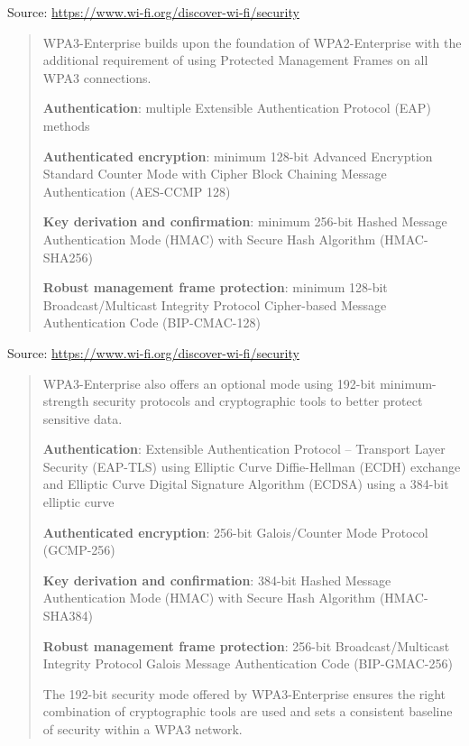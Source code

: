 \documentclass[Screen16to9,17pt]{foils}
\begin{document}
Source: \url{https://www.wi-fi.org/discover-wi-fi/security}




\begin{quote}
WPA3-Enterprise builds upon the foundation of WPA2-Enterprise with the additional requirement of using Protected Management Frames on all WPA3 connections.

\begin{list2}
\item {\bf Authentication}: multiple Extensible Authentication Protocol (EAP) methods
\item {\bf Authenticated encryption}: minimum 128-bit Advanced Encryption Standard Counter Mode with Cipher Block Chaining Message Authentication (AES-CCMP 128)
\item {\bf Key derivation and confirmation}: minimum 256-bit Hashed Message Authentication Mode (HMAC) with Secure Hash Algorithm (HMAC-SHA256)
\item {\bf Robust management frame protection}: minimum 128-bit Broadcast/Multicast Integrity Protocol Cipher-based Message Authentication Code (BIP-CMAC-128)
\end{list2}
\end{quote}

Source: \url{https://www.wi-fi.org/discover-wi-fi/security}



\begin{quote}

WPA3-Enterprise also offers an optional mode using 192-bit minimum-strength security protocols and cryptographic tools to better protect sensitive data.

\begin{list2}
\item {\bf Authentication}: Extensible Authentication Protocol – Transport Layer Security (EAP-TLS) using Elliptic Curve Diffie-Hellman (ECDH) exchange and Elliptic Curve Digital Signature Algorithm (ECDSA) using a 384-bit elliptic curve
\item {\bf Authenticated encryption}: 256-bit Galois/Counter Mode Protocol (GCMP-256)
\item {\bf Key derivation and confirmation}: 384-bit Hashed Message Authentication Mode (HMAC) with Secure Hash Algorithm (HMAC-SHA384)
\item {\bf Robust management frame protection}: 256-bit Broadcast/Multicast Integrity Protocol Galois Message Authentication Code (BIP-GMAC-256)
\end{list2}
The 192-bit security mode offered by WPA3-Enterprise ensures the right combination of cryptographic tools are used and sets a consistent baseline of security within a WPA3 network.
\end{quote}
\end{document}
